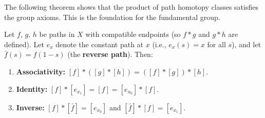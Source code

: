 \documentclass[11pt]{report}
\begin{document}
The following theorem shows that the product of path homotopy classes satisfies the group axioms. This is the foundation for the fundamental group.

\begin{thmbox}
Let $f$, $g$, $h$ be paths in $X$ with compatible endpoints (so $f * g$ and $g * h$ are defined). Let $e_{x}$ denote the constant path at $x$ (i.e., $e_x(s) = x$ for all $s$), and let $\bar{f}(s) = f(1-s)$ (the \textbf{reverse path}). Then:
\begin{enumerate}
    \item \textbf{Associativity:} $[f] * ([g] * [h]) = ([f] * [g]) * [h]$.
    \item \textbf{Identity:} $[f] * [e_{x_1}] = [f] = [e_{x_0}] * [f]$.
    \item \textbf{Inverse:} $[f] * [\bar{f}] = [e_{x_0}]$ and $[\bar{f}] * [f] = [e_{x_1}]$.
\end{enumerate}
\end{thmbox}
\end{document}
